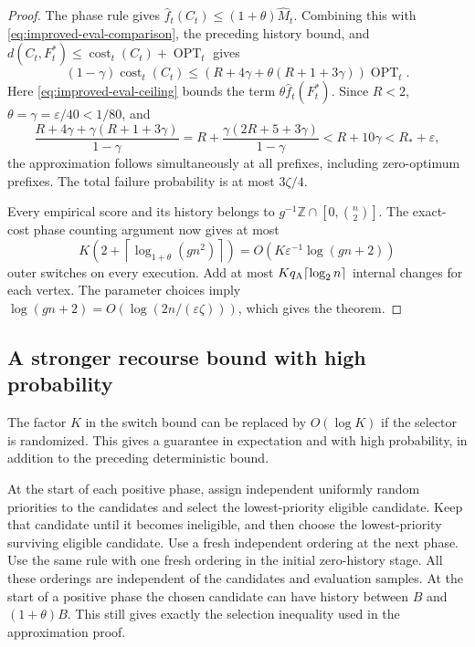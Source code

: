 \documentclass[11pt]{article}
\begin{document}
\begin{proof}
The phase rule gives
$\widehat f_t(C_t)\le(1+\theta)\widehat M_t$.
Combining this with \eqref{eq:improved-eval-comparison}, the preceding
history bound, and
$d(C_t,F_t^*)\le\operatorname{cost}_t(C_t)+\operatorname{OPT}_t$
gives
\[
 (1-\gamma)\operatorname{cost}_t(C_t)
 \le\left(R+4\gamma+\theta(R+1+3\gamma)\right)
          \operatorname{OPT}_t.
\]
Here \eqref{eq:improved-eval-ceiling} bounds the term
$\theta\widehat f_t(F_t^*)$. Since $R<2$,
$\theta=\gamma=\varepsilon/40<1/80$, and
\[
 \frac{R+4\gamma+\gamma(R+1+3\gamma)}{1-\gamma}
 =R+\frac{\gamma(2R+5+3\gamma)}{1-\gamma}
 <R+10\gamma<R_*+\varepsilon,
\]
the approximation follows simultaneously at all prefixes, including
zero-optimum prefixes. The total failure probability is at most
$3\zeta/4$.

Every empirical score and its history belongs to
$g^{-1}\mathbb Z\cap[0,\binom n2]$. The exact-cost phase counting argument
now gives at most
\[
 K\left(2+\left\lceil\log_{1+\theta}(g n^2)\right\rceil\right)
 =O(K\varepsilon^{-1}\log(gn+2))
\]
outer switches on every execution. Add at most
$Kq_{\rm A}\lceil\log_2n\rceil$ internal changes for each vertex.
The parameter choices imply
$\log(gn+2)=O(\log(2n/(\varepsilon\zeta)))$, which gives the theorem.
\end{proof}

\subsection{A stronger recourse bound with high probability}

The factor $K$ in the switch bound can be replaced by $O(\log K)$
if the selector is randomized. This gives a guarantee in expectation and
with high probability, in addition to the preceding deterministic bound.

At the start of each positive phase, assign independent uniformly random
priorities to the candidates and select the lowest-priority eligible
candidate. Keep that candidate until it becomes ineligible, and then
choose the lowest-priority surviving eligible candidate. Use a fresh
independent ordering at the next phase. Use the same rule with one fresh
ordering in the initial zero-history stage. All these orderings are
independent of the candidates and evaluation samples. At the start of a
positive phase the chosen candidate can have history between $B$ and
$(1+\theta)B$. This still gives exactly the selection inequality used in
the approximation proof.
\end{document}
